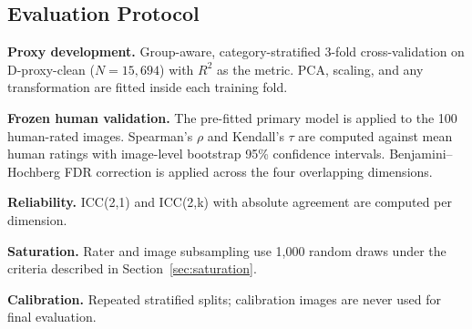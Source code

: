 \subsection{Evaluation Protocol}

\textbf{Proxy development.} Group-aware, category-stratified 3-fold cross-validation on D-proxy-clean ($N = 15{,}694$) with $R^2$ as the metric. PCA, scaling, and any transformation are fitted inside each training fold.

\textbf{Frozen human validation.} The pre-fitted primary model is applied to the 100 human-rated images. Spearman's $\rho$ and Kendall's $\tau$ are computed against mean human ratings with image-level bootstrap 95\% confidence intervals. Benjamini--Hochberg FDR correction is applied across the four overlapping dimensions.

\textbf{Reliability.} ICC(2,1) and ICC(2,k) with absolute agreement are computed per dimension.

\textbf{Saturation.} Rater and image subsampling use 1,000 random draws under the criteria described in Section~\ref{sec:saturation}.

\textbf{Calibration.} Repeated stratified splits; calibration images are never used for final evaluation.
